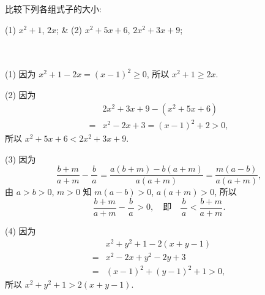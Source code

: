 \begin{example}\label{exa: 2020-1013-2030}
  比较下列各组式子的大小:
  \begin{twocolpro}
    (1) $x^2+1$, $2x$; & (2) $x^2+5x+6$, $2x^2+3x+9$;\\
    \\
    \\
  \end{twocolpro}
\end{example}
\begin{solution}
  (1) 因为 $x^2+1-2x=(x-1)^2\geqslant 0$, 所以 $x^2+1\geqslant 2x$.
  
  (2) 因为 
  \begin{align*}
       &2x^2+3x+9- (x^2+5x+6)\\
    ={}& x^2-2x+3= (x-1)^2+2>0,
  \end{align*}
  所以 $x^2+5x+6< 2x^2+3x+9$.
  
  (3) 因为 
  \[\frac{b+m}{a+m}- \frac{\,b\,}a
    = \frac{a(b+m)-b(a+m)}{a(a+m)}
    = \frac{m(a-b)}{a(a+m)},\]
  由 $a>b>0$, $m>0$ 知 $m(a-b)>0$, $a(a+m)>0$, 所以 
  \[\frac{b+m}{a+m}- \frac{\,b\,}a>0,\quad \text{即}\quad 
    \frac{\,b\,}a< \frac{b+m}{a+m}.\]
  
  (4) 因为 
  \begin{align*}
       &x^2+y^2+1- 2(x+y-1)\\
    ={}& x^2-2x+y^2-2y+3\\
    ={}& (x-1)^2+(y-1)^2+1>0,
  \end{align*}
  所以 $x^2+y^2+1> 2(x+y-1)$.
\end{solution}
